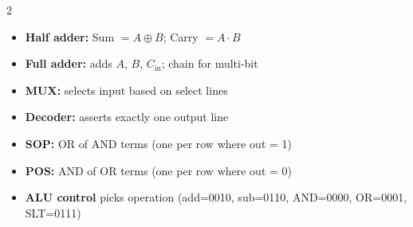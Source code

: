 \documentclass[11pt, letterpaper]{article}
\begin{document}
\begin{tcolorbox}[colback=part5bg, colframe=sectionteal,
  title={\bfseries Key Circuits}, arc=3pt, boxrule=1pt]
\footnotesize
\begin{multicols}{2}
\begin{itemize}[noitemsep, leftmargin=*]
  \item \textbf{Half adder:} Sum $= A\oplus B$; Carry $= A\cdot B$
  \item \textbf{Full adder:} adds $A$, $B$, $C_{\mathrm{in}}$; chain for multi-bit
  \item \textbf{MUX:} selects input based on select lines
  \item \textbf{Decoder:} asserts exactly one output line
\end{itemize}
\columnbreak
\begin{itemize}[noitemsep, leftmargin=*]
  \item \textbf{SOP:} OR of AND terms (one per row where out = 1)
  \item \textbf{POS:} AND of OR terms (one per row where out = 0)
  \item \textbf{ALU control} picks operation (add=0010, sub=0110, AND=0000, OR=0001, SLT=0111)
\end{itemize}
\end{multicols}
\end{tcolorbox}

\vspace{4pt}
\end{document}
